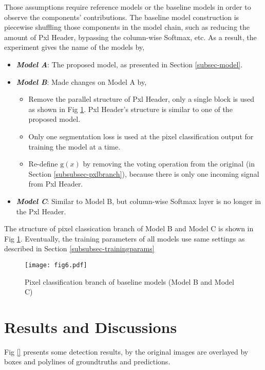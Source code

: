 \documentclass[default,pdflatex,iicol]{sn-jnl}%
\begin{document}
Those assumptions require reference models or the baseline models in order to observe the components' contributions. The baseline model construction is piecewise shuffling those components in the model chain, such as reducing the amount of Pxl Header, bypassing the column-wise Softmax, etc. As a result, the experiment gives the name of the models by,
\begin{itemize} 
\item[] \emph{\textbf{Model A}}: The proposed model, as presented in Section \ref{subsec-model}. \\
\item[] \emph{\textbf{Model B}}: Made changes on Model A by,
	\begin{itemize}
  	\item Remove the parallel structure of Pxl Header, only a single block is used as shown in Fig \ref{fig6-baselinePxlHeader}. Pxl Header's structure is similar to one of the proposed model. 
  	\item Only one segmentation loss is used at the pixel classification output for training the model at a time.
  	\item Re-define $\mathrm{g}(x)$ by removing the voting operation from the original (in Section \ref{subsubsec-pxlbranch}), because there is only one incoming signal from Pxl Header.
	\end{itemize}
\item[] \emph{\textbf{Model C}}: Similar to Model B, but column-wise Softmax layer is no longer in the Pxl Header.
\end{itemize}

The structure of pixel classication branch of Model B and Model C is shown in Fig \ref{fig6-baselinePxlHeader}. Eventually, the training parameters of all models use same settings as described in Section \ref{subsubsec-trainingparams}

\begin{figure}[h]%
\centering
\texttt{[image: fig6.pdf]}
\caption{Pixel classification branch of baseline models (Model B and Model C)}\label{fig6-baselinePxlHeader}
\end{figure}

\section{Results and Discussions}\label{sec-results}
Fig \ref{} presents some detection results, by the original images are overlayed by boxes and polylines of groundtruths and predictions. 
\end{document}
